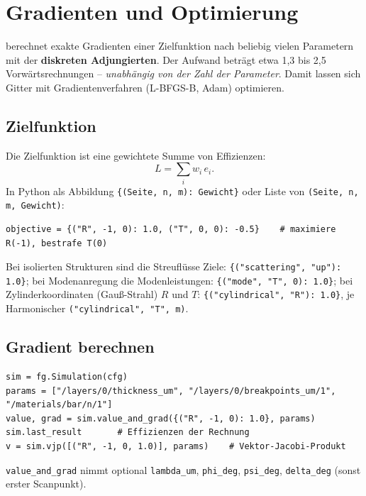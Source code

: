\chapter{Gradienten und Optimierung}\label{ch:optimierung}
%

\FG{} berechnet exakte Gradienten einer Zielfunktion nach beliebig vielen Parametern mit der
\textbf{diskreten Adjungierten}. Der Aufwand beträgt etwa 1,3 bis 2,5 Vorwärtsrechnungen -- \emph{unabhängig von der
Zahl der Parameter}. Damit lassen sich Gitter mit Gradientenverfahren (L-BFGS-B, Adam) optimieren.

\section{Zielfunktion}
Die Zielfunktion ist eine gewichtete Summe von Effizienzen:
\begin{equation}
  L=\sum_i w_i\,e_i .
\end{equation}
In Python als Abbildung \texttt{\{(Seite, n, m): Gewicht\}} oder Liste von \texttt{(Seite, n, m, Gewicht)}:
\begin{lstlisting}[style=py]
objective = {("R", -1, 0): 1.0, ("T", 0, 0): -0.5}    # maximiere R(-1), bestrafe T(0)
\end{lstlisting}
Bei isolierten Strukturen sind die Streuflüsse Ziele: \texttt{\{("scattering", "up"): 1.0\}}; bei Modenanregung
die Modenleistungen: \texttt{\{("mode", "T", 0): 1.0\}}; bei Zylinderkoordinaten (Gauß-Strahl) $R$ und $T$:
\texttt{\{("cylindrical", "R"): 1.0\}}, je Harmonischer \texttt{("cylindrical", "T", m)}.

\section{Gradient berechnen}
\begin{lstlisting}[style=py]
sim = fg.Simulation(cfg)
params = ["/layers/0/thickness_um", "/layers/0/breakpoints_um/1", "/materials/bar/n/1"]
value, grad = sim.value_and_grad({("R", -1, 0): 1.0}, params)
sim.last_result       # Effizienzen der Rechnung
v = sim.vjp([("R", -1, 0, 1.0)], params)    # Vektor-Jacobi-Produkt
\end{lstlisting}
\texttt{value\_and\_grad} nimmt optional \texttt{lambda\_um}, \texttt{phi\_deg}, \texttt{psi\_deg},
\texttt{delta\_deg} (sonst erster Scanpunkt).

